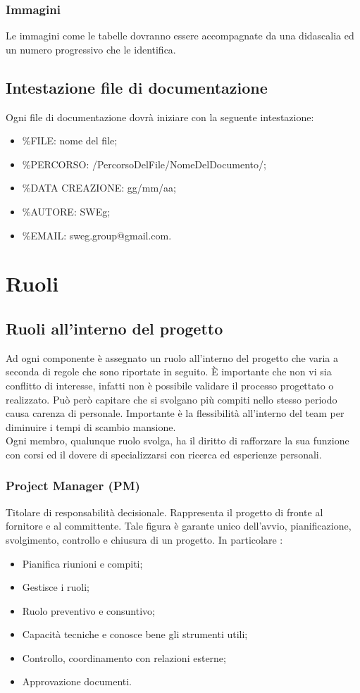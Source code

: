 \documentclass[12pt,a4paper,titlepage]{article}
\begin{document}
\subsubsection{Immagini}
Le immagini come le tabelle dovranno essere accompagnate da una didascalia ed un numero progressivo che le identifica.
\subsection{Intestazione file di documentazione}
Ogni file di documentazione dovrà iniziare con la seguente intestazione:
\begin{itemize}
	\item \%FILE: nome del file;
	\item \%PERCORSO: /PercorsoDelFile/NomeDelDocumento/;
	\item \%DATA CREAZIONE: gg/mm/aa;
	\item \%AUTORE: SWEg;
	\item \%EMAIL: sweg.group@gmail.com.
\end{itemize}
\newpage
{}
\section{Ruoli}
\subsection{Ruoli all'interno del progetto}
Ad ogni componente è assegnato un ruolo all'interno del progetto che varia a seconda di regole che sono riportate in seguito. È importante che non vi sia conflitto di interesse, infatti non è possibile validare il processo progettato o realizzato. Può però capitare che si svolgano più compiti nello stesso periodo causa carenza di personale. Importante è la flessibilità all'interno del team per diminuire i tempi di scambio mansione.\\
Ogni membro, qualunque ruolo svolga, ha il diritto di rafforzare la sua funzione con corsi ed il dovere di specializzarsi con ricerca ed esperienze personali.
\subsubsection{Project Manager (PM)} 
Titolare di responsabilità decisionale. Rappresenta il progetto di fronte al fornitore e al committente. Tale figura è garante unico dell'avvio, pianificazione, svolgimento, controllo e chiusura di un progetto. In particolare :
\begin{itemize}
	\item Pianifica riunioni e compiti;
	\item Gestisce i ruoli;
	\item Ruolo preventivo e consuntivo;
	\item Capacità tecniche e conosce bene gli strumenti utili;
	\item Controllo, coordinamento con relazioni esterne;
	\item Approvazione documenti.
\end{itemize}
\end{document}
